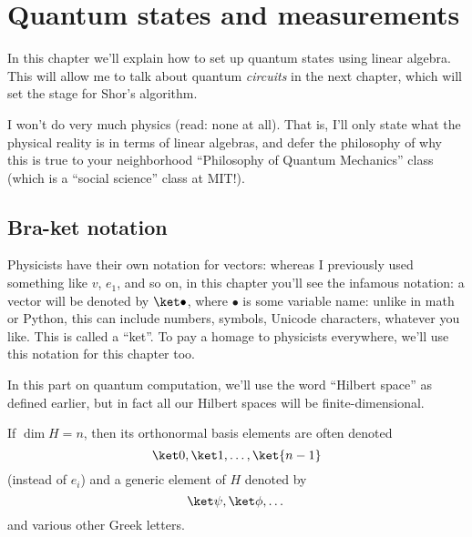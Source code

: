 \chapter{Quantum states and measurements}
In this chapter we'll explain how to set up quantum states using
linear algebra. This will allow me to talk about quantum \emph{circuits}
in the next chapter, which will set the stage for Shor's algorithm.

I won't do very much physics (read: none at all).
That is, I'll only state what the physical reality is in terms
of linear algebras, and defer the philosophy of why this is true
to your neighborhood ``Philosophy of Quantum Mechanics'' class
(which is a ``social science'' class at MIT!).

\section{Bra-ket notation}
Physicists have their own notation for vectors:
whereas I previously used something like $v$, $e_1$, and so on,
in this chapter you'll see the infamous  notation:
a vector will be denoted by $\ket\bullet$, where $\bullet$ is some
variable name: unlike in math or Python, this can include
numbers, symbols, Unicode characters, whatever you like.
This is called a ``ket''.
To pay a homage to physicists everywhere,
we'll use this notation for this chapter too.

\begin{abuse}
	In this part on quantum computation,
	we'll use the word ``Hilbert space'' as defined earlier,
	but in fact all our Hilbert spaces will be finite-dimensional.
\end{abuse}

If $\dim H = n$, then its orthonormal basis elements are often denoted
\[ \ket0, \ket1, \dots, \ket{n-1} \]
(instead of $e_i$)
and a generic element of $H$ denoted by
\[ \ket\psi, \ket\phi, \dots \]
and various other Greek letters.

